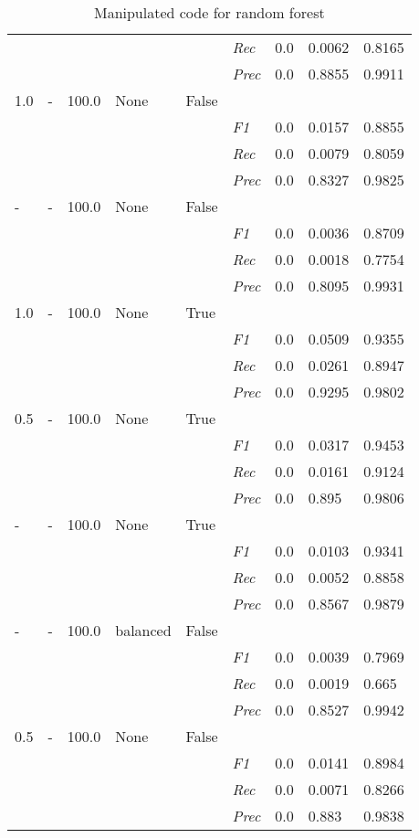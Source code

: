 \begin{table}[]
\begin{tabularx}{\textwidth}{XXXXX|X|X|X|X}
& & & & & \textit{Rec} &  0.0 & 0.0062 & 0.8165   \\
& & & & & \textit{Prec} & 0.0 & 0.8855 & 0.9911 \\ \midrule
1.0 & - & 100.0 & None & False & & & \\
& & & & & \textit{F1} & 0.0 & 0.0157    & 0.8855    \\
& & & & & \textit{Rec} &  0.0 & 0.0079 & 0.8059   \\
& & & & & \textit{Prec} & 0.0 & 0.8327 & 0.9825 \\ \midrule
- & - & 100.0 & None & False & & & \\
& & & & & \textit{F1} & 0.0 & 0.0036    & 0.8709    \\
& & & & & \textit{Rec} &  0.0 & 0.0018 & 0.7754   \\
& & & & & \textit{Prec} & 0.0 & 0.8095 & 0.9931 \\ \midrule
1.0 & - & 100.0 & None & True & & & \\
& & & & & \textit{F1} & 0.0 & 0.0509    & 0.9355    \\
& & & & & \textit{Rec} &  0.0 & 0.0261 & 0.8947   \\
& & & & & \textit{Prec} & 0.0 & 0.9295 & 0.9802 \\ \midrule
0.5 & - & 100.0 & None & True & & & \\
& & & & & \textit{F1} & 0.0 & 0.0317    & 0.9453    \\
& & & & & \textit{Rec} &  0.0 & 0.0161 & 0.9124   \\
& & & & & \textit{Prec} & 0.0 & 0.895 & 0.9806 \\ \midrule
- & - & 100.0 & None & True & & & \\
& & & & & \textit{F1} & 0.0 & 0.0103    & 0.9341    \\
& & & & & \textit{Rec} &  0.0 & 0.0052 & 0.8858   \\
& & & & & \textit{Prec} & 0.0 & 0.8567 & 0.9879 \\ \midrule
- & - & 100.0 & balanced & False & & & \\
& & & & & \textit{F1} & 0.0 & 0.0039    & 0.7969    \\
& & & & & \textit{Rec} &  0.0 & 0.0019 & 0.665   \\
& & & & & \textit{Prec} & 0.0 & 0.8527 & 0.9942 \\ \midrule
0.5 & - & 100.0 & None & False & & & \\
& & & & & \textit{F1} & 0.0 & 0.0141    & 0.8984    \\
& & & & & \textit{Rec} &  0.0 & 0.0071 & 0.8266   \\
& & & & & \textit{Prec} & 0.0 & 0.883 & 0.9838 \\ \midrule
\end{tabularx}
\caption{Manipulated code for random forest}
\label{tab:rq3_random_forest}
\end{table}

